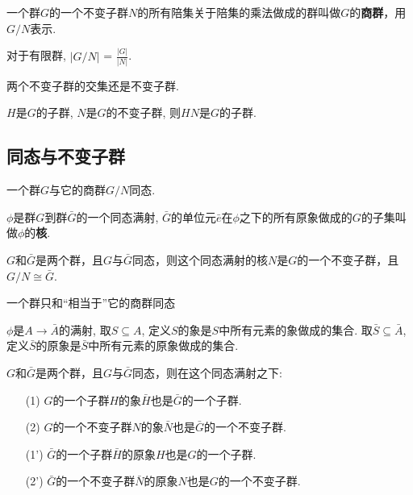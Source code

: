 \begin{Definition}[商群]
一个群$G$的一个不变子群$N$的所有陪集关于陪集的乘法做成的群叫做$G$的\textbf{商群}，用$G/N$表示.
\end{Definition}

\begin{Theorem}
对于有限群, $ \displaystyle | G/N | $ = $\frac{|G|}{|N|}$.
\end{Theorem}

\begin{Proposition}
两个不变子群的交集还是不变子群.
\end{Proposition}

\begin{Proposition}
$H$是$G$的子群, $N$是$G$的不变子群, 则$HN$是$G$的子群.
\end{Proposition}

\subsection{同态与不变子群}

\begin{Theorem}
一个群$G$与它的商群$G/N$同态.
\end{Theorem}

\begin{Definition}[核]
$\phi$是群$G$到群$\bar{G}$的一个同态满射, $\bar{G}$的单位元$\bar{e}$在$\phi$之下的所有原象做成的$G$的子集叫做$\phi$的\textbf{核}.
\end{Definition}

\begin{Theorem}
$G$和$\bar{G}$是两个群，且$G$与$\bar{G}$同态，则这个同态满射的核$N$是$G$的一个不变子群，且$G/N \cong \bar{G}$.
\end{Theorem}

\begin{Remark}
一个群只和``相当于''它的商群同态
\end{Remark}

\begin{Definition}
$\phi$是$A \rightarrow \bar{A}$的满射, 取$S \subseteq A$, 定义$S$的象是$S$中所有元素的象做成的集合. 取$\bar{S} \subseteq \bar{A}$, 定义$\bar{S}$的原象是$\bar{S}$中所有元素的原象做成的集合.
\end{Definition}

\begin{Theorem}
$G$和$\bar{G}$是两个群，且$G$与$\bar{G}$同态，则在这个同态满射之下:
\begin{itemize}
\item[(1)] $G$的一个子群$H$的象$\bar{H}$也是$\bar{G}$的一个子群.
\item[(2)] $G$的一个不变子群$N$的象$\bar{N}$也是$\bar{G}$的一个不变子群.
\item[(1')] $\bar{G}$的一个子群$\bar{H}$的原象$H$也是$G$的一个子群.
\item[(2')] $\bar{G}$的一个不变子群$\bar{N}$的原象$N$也是$G$的一个不变子群.
\end{itemize}
\end{Theorem}


